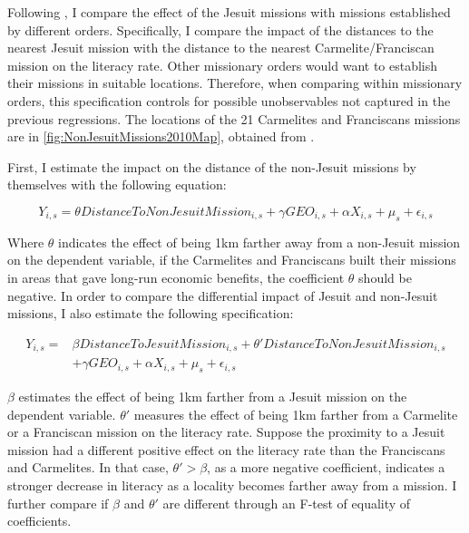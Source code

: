 \documentclass{article}
\begin{document}
Following \textcite{Valencia_Caicedo2018-gp}, I compare the effect of the Jesuit missions with missions established by different orders.
Specifically, I compare the impact of the distances to the nearest Jesuit mission with the distance to the nearest Carmelite/Franciscan mission on the literacy rate. 
Other missionary orders would want to establish their missions in suitable locations.
Therefore, when comparing within missionary orders, this specification controls for possible unobservables not captured in the previous regressions.
The locations of the 21 Carmelites and Franciscans missions are in \autoref{fig:NonJesuitMissions2010Map}, obtained from \textcite{Bombardi2014-jf}. 

First, I estimate the impact on the distance of the non-Jesuit missions by themselves with the following equation:

\begin{equation}
\label{eqn:otherreg}
	Y_{i,s} = \theta \textit{DistanceToNonJesuitMission}_{i,s} + \gamma \textit{GEO}_{i,s} +  \alpha \textit{X}_{i,s} + \mu_s + \epsilon_{i,s}
\end{equation}

Where $\theta$ indicates the effect of being 1km farther away from a non-Jesuit mission on the dependent variable, if the Carmelites and Franciscans built their missions in areas that gave long-run economic benefits, the coefficient $\theta$ should be negative. 
In order to compare the differential impact of Jesuit and non-Jesuit missions, I also estimate the following specification: 

\begin{equation}
\label{eqn:bothreg}
\begin{split}
	Y_{i,s} = & \beta \textit{DistanceToJesuitMission}_{i,s} + \theta' \textit{DistanceToNonJesuitMission}_{i,s} \\ & +  
	\gamma \textit{GEO}_{i,s} +  \alpha \textit{X}_{i,s} + \mu_s + \epsilon_{i,s}
\end{split}	
\end{equation}

$\beta$ estimates the effect of being 1km farther from a Jesuit mission on the dependent variable. 
$\theta'$ measures the effect of being 1km farther from a Carmelite or a Franciscan mission on the literacy rate. 
Suppose the proximity to a Jesuit mission had a different positive effect on the literacy rate than the Franciscans and Carmelites. 
In that case, $\theta' > \beta$, as a more negative coefficient, indicates a stronger decrease in literacy as a locality becomes farther away from a mission.
I further compare if $\beta$ and $\theta'$ are different through an F-test of equality of coefficients.
\end{document}
